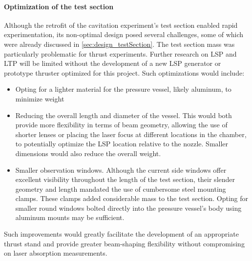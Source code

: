         \paragraph{Optimization of the test section} Although the retrofit of the cavitation experiment's test section enabled rapid experimentation, its non-optimal design posed several challenges, some of which were already discussed in \autoref{sec:design_testSection}. The test section mass was particularly problematic for thrust experiments. Further research on LSP and LTP will be limited without the development of a new LSP generator or prototype thruster optimized for this project. Such optimizations would include:
        \begin{itemize}
            \item Opting for a lighter material for the pressure vessel, likely aluminum, to minimize weight
            \item Reducing the overall length and diameter of the vessel. This would both provide more flexibility in terms of beam geometry, allowing the use of shorter lenses or placing the laser focus at different locations in the chamber, to potentially optimize the LSP location relative to the nozzle. Smaller dimensions would also reduce the overall weight.
            \item Smaller observation windows. Although the current side windows offer excellent visibility throughout the length of the test section, their slender geometry and length mandated the use of cumbersome steel mounting clamps. These clamps added considerable mass to the test section. Opting for smaller round windows bolted directly into the pressure vessel's body using aluminum mounts may be sufficient.
        \end{itemize}
        Such improvements would greatly facilitate the development of an appropriate thrust stand and provide greater beam-shaping flexibility without compromising on laser absorption measurements.

